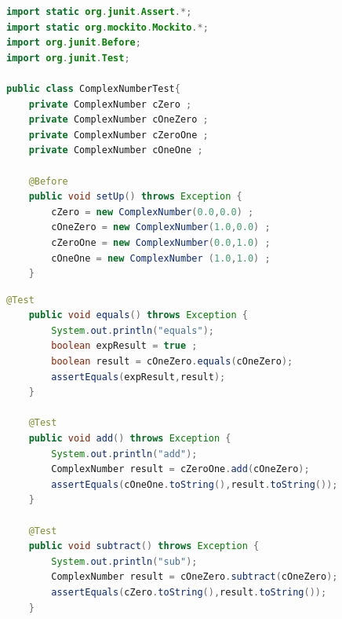 \documentclass[11pt, xcolor=svgnames]{beamer}
\begin{document}

\begin{frame}[fragile]
\begin{lstlisting}[language=JAVA,basicstyle=\tiny]
import static org.junit.Assert.*;
import static org.mockito.Mockito.*;
import org.junit.Before;
import org.junit.Test;

public class ComplexNumberTest{
	private ComplexNumber cZero ;
	private ComplexNumber cOneZero ;
	private ComplexNumber cZeroOne ;
	private ComplexNumber cOneOne ;
	
	@Before
	public void setUp() throws Exception {
		cZero = new ComplexNumber(0.0,0.0) ;
		cOneZero = new ComplexNumber(1.0,0.0) ;
		cZeroOne = new ComplexNumber(0.0,1.0) ;
		cOneOne = new ComplexNumber (1.0,1.0) ;
	}
\end{lstlisting}
\end{frame}


\begin{frame}[fragile]

\begin{lstlisting}[language=Java,basicstyle=\tiny]
	@Test
	public void equals() throws Exception {
		System.out.println("equals");
		boolean expResult = true ;
		boolean result = cOneZero.equals(cOneZero);
		assertEquals(expResult,result);
	}

	@Test
	public void add() throws Exception {
		System.out.println("add");
		ComplexNumber result = cZeroOne.add(cOneZero);
		assertEquals(cOneOne.toString(),result.toString());
	}

	@Test
	public void subtract() throws Exception	{
		System.out.println("sub");
		ComplexNumber result = cOneZero.subtract(cOneZero);
		assertEquals(cZero.toString(),result.toString());
	}
\end{lstlisting}

\end{frame}

\end{document}
